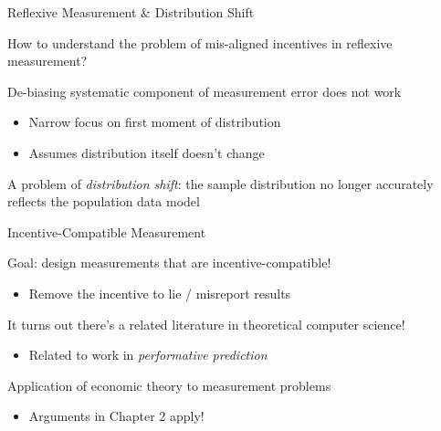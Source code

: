 \documentclass[aspectratio=169,xcolor=dvipsnames]{beamer}
\begin{document}

\begin{frame}{Reflexive Measurement \& Distribution Shift}

How to understand the problem of mis-aligned incentives in reflexive measurement?

\vspace{5mm}
De-biasing systematic component of measurement error does not work
\begin{itemize}
    \item Narrow focus on first moment of distribution
    \item Assumes distribution itself doesn't change
\end{itemize}

\vspace{5mm}
{\color{red}A problem of \textit{distribution shift}: the sample distribution no longer accurately reflects the population data model}

\end{frame}


\begin{frame}{Incentive-Compatible Measurement}

{\color{red}Goal: design measurements that are incentive-compatible!}
\begin{itemize}
    \item Remove the incentive to lie / misreport results
\end{itemize}

\vspace{5mm}
It turns out there's a related literature in theoretical computer science!
\begin{itemize}
    \item Related to work in \textit{performative prediction} \autocite{perdomo2020,oesterheld23}
\end{itemize}

\vspace{5mm}
Application of economic theory to measurement problems
\begin{itemize}
    \item Arguments in Chapter 2 apply!
\end{itemize}

\end{frame}


\end{document}
